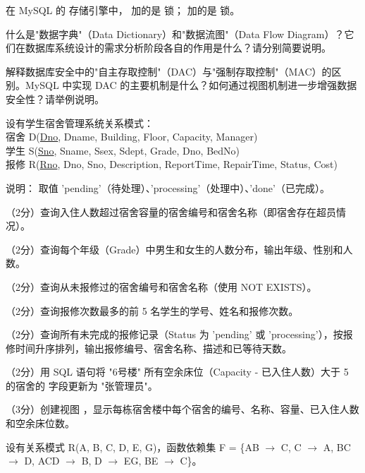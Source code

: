 \documentclass[a4paper,11pt]{article}
\begin{document}
\q 在 MySQL 的  存储引擎中， 加的是 \fillblank 锁； 加的是 \fillblank 锁。


\q 什么是"数据字典"（Data Dictionary）和"数据流图"（Data Flow Diagram）？它们在数据库系统设计的需求分析阶段各自的作用是什么？请分别简要说明。
\anslines{3cm}

\q 解释数据库安全中的"自主存取控制"（DAC）与"强制存取控制"（MAC）的区别。MySQL 中实现 DAC 的主要机制是什么？如何通过视图机制进一步增强数据安全性？请举例说明。
\anslines{3cm}


设有学生宿舍管理系统关系模式：\\
宿舍 D(\underline{Dno}, Dname, Building, Floor, Capacity, Manager)\\
学生 S(\underline{Sno}, Sname, Ssex, Sdept, Grade, Dno, BedNo)\\
报修 R(\underline{Rno}, Dno, Sno, Description, ReportTime, RepairTime, Status, Cost)

说明： 取值 'pending'（待处理）、'processing'（处理中）、'done'（已完成）。

\q （2分）查询入住人数超过宿舍容量的宿舍编号和宿舍名称（即宿舍存在超员情况）。
\anslines{1cm}

\q （2分）查询每个年级（Grade）中男生和女生的人数分布，输出年级、性别和人数。
\anslines{1cm}

\q （2分）查询从未报修过的宿舍编号和宿舍名称（使用 NOT EXISTS）。
\anslines{1cm}

\q （2分）查询报修次数最多的前 5 名学生的学号、姓名和报修次数。
\anslines{1cm}

\q （2分）查询所有未完成的报修记录（Status 为 'pending' 或 'processing'），按报修时间升序排列，输出报修编号、宿舍名称、描述和已等待天数。
\anslines{1cm}

\q （2分）用 SQL 语句将 "6号楼" 所有空余床位（Capacity - 已入住人数）大于 5 的宿舍的  字段更新为 "张管理员"。
\anslines{1.2cm}

\q （3分）创建视图 ，显示每栋宿舍楼中每个宿舍的编号、名称、容量、已入住人数和空余床位数。
\anslines{1.5cm}


\q 设有关系模式 R(A, B, C, D, E, G)，函数依赖集 F = \{AB $\rightarrow$ C, C $\rightarrow$ A, BC $\rightarrow$ D, ACD $\rightarrow$ B, D $\rightarrow$ EG, BE $\rightarrow$ C\}。
\end{document}
